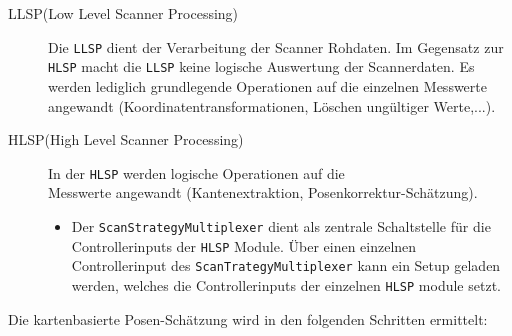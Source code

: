\begin{description}
\item[LLSP(Low Level Scanner Processing)] Die \lstinline{LLSP} dient der
Verarbeitung der Scanner Rohdaten. Im Gegensatz zur \lstinline{HLSP} macht die
\lstinline{LLSP} keine logische Auswertung der Scannerdaten.
 Es werden lediglich grundlegende Operationen auf die einzelnen Messwerte angewandt
 (Koordinatentransformationen, Löschen ungültiger Werte,...).
\item[HLSP(High Level Scanner Processing)] In der \lstinline{HLSP} werden
logische Operationen auf die\\ Messwerte angewandt (Kantenextraktion,
Posenkorrektur-Schätzung).
\begin{itemize}
  \item Der \lstinline{ScanStrategyMultiplexer} dient als zentrale Schaltstelle
  für die Controllerinputs der \lstinline{HLSP} Module.
  Über einen einzelnen Controllerinput des \lstinline{ScanTrategyMultiplexer}
  kann ein Setup geladen werden, welches die Controllerinputs der einzelnen
 \lstinline{HLSP} module setzt.
\end{itemize}
\end{description}

Die kartenbasierte Posen-Schätzung wird in den folgenden Schritten ermittelt:

